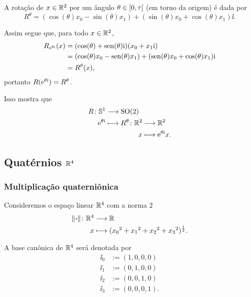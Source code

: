 A rotação de $x \in \mathbb{R}^2$ por um ângulo $\theta \in \left[{0},{\tau}\right[$ (em torno da origem) é dada por
	\begin{equation*}
	R^\theta = (\cos(\theta)x_0 - \sin(\theta)x_1) + (\sin(\theta)x_0 + \cos(\theta)x_1) \ii.
	\end{equation*}

Assim segue que, para todo $x \in \mathbb{R}^2$,
	\begin{align*}
	R_{\mathrm{e}^{\theta \mathrm{i}}}(x) &= (\cos(\theta) + \operatorname{sen}(\theta)\mathrm{i})(x_0 + x_1 \mathrm{i}) \\
		&= (\cos(\theta)x_0 - \operatorname{sen}(\theta)x_1) + (\operatorname{sen}(\theta)x_0 + \cos(\theta)x_1) \mathrm{i} \\
		&= R^\theta(x),
	\end{align*}
portanto $R(\mathrm{e}^{\theta \mathrm{i}}) = R^{\theta}$.

Isso mostra que
	\begin{align*}
	\func{R}{\S^1}{\SO(2)}{\e^{\theta \ii}}{
		\begin{aligned}[t]
			\func{R^{\theta}}{\R^2}{\R^2}{x}{\e^{\theta \ii} x}.
		\end{aligned}
	}
	\end{align*}



\subsection{Quatérnios \ensuremath{\R^4}}

\subsubsection{Multiplicação quaterniônica}

Consideremos o espaço linear $\mathbb{R}^4$ com a norma $2$
	\begin{align*}
	{\left\Vert{\bm{\cdot}}\right\Vert}\colon {\mathbb{R}^4} &\longrightarrow {\mathbb{R}} \\{x} &\longmapsto ({x_0}^2+{x_1}^2+{x_2}^2+{x_3}^2)^{\frac{1}{2}}.
	\end{align*}

A base canônica de $\mathbb{R}^4$ será denotada por
	\begin{align*}
	\ii_0 &:= (1,0,0,0) \\
	\ii_1 &:= (0,1,0,0) \\
	\ii_2 &:= (0,0,1,0) \\
	\ii_3 &:= (0,0,0,1).
	\end{align*}


